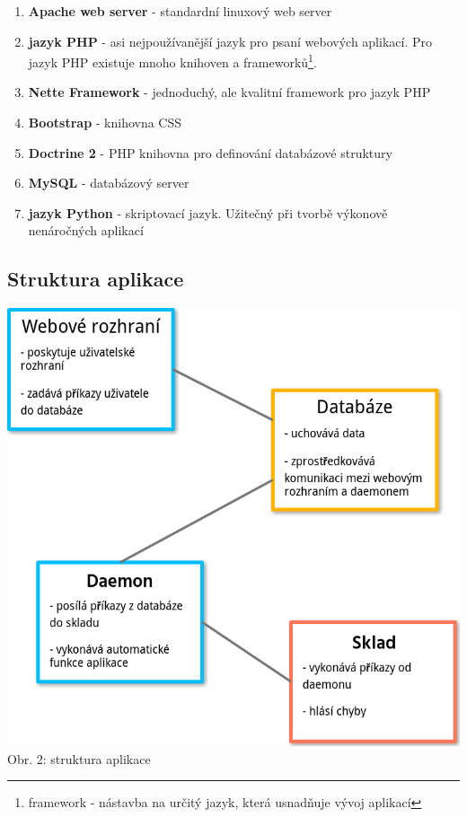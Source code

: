 \documentclass[12pt, a4paper, oneside]{article}
\begin{document}
\begin{enumerate}
\item \textbf{Apache web server}\cite{apache} - standardní linuxový web server
\item \textbf{jazyk PHP}\cite{php} - asi nejpoužívanější jazyk pro psaní webových aplikací. Pro jazyk PHP existuje mnoho knihoven a frameworků\footnote{framework - nástavba na určitý jazyk, která usnadňuje vývoj aplikací}.
\item \textbf{Nette Framework}\cite{nette} - jednoduchý, ale kvalitní framework pro jazyk PHP
\item \textbf{Bootstrap}\cite{bootstrap} - knihovna CSS
\item \textbf{Doctrine 2}\cite{doctrine} - PHP knihovna pro definování databázové struktury
\item \textbf{MySQL}\cite{mysql} - databázový server
\item \textbf{jazyk Python}\cite{python} - skriptovací jazyk. Užitečný při tvorbě výkonově nenáročných aplikací
\end{enumerate}

\subsection{Struktura aplikace}

\begin{minipage}{\textwidth}
\begin{center}
\includegraphics[scale=0.40]{img/structure.png}
\\
\caption{Obr. 2: struktura aplikace}
\end{center}
\end{minipage}
\vspace{4mm}
\end{document}
